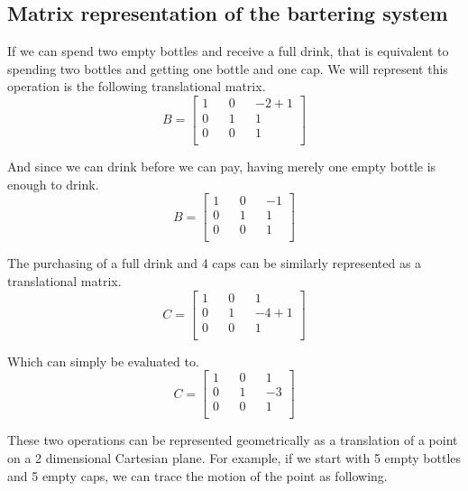 \documentclass[letterpaper, 12pt]{article}
\begin{document}
\subsection{Matrix representation of the bartering system}
\par If we can spend two empty bottles and receive a full drink, that is equivalent to spending two bottles and getting one bottle and one cap.
We will represent this operation is the following translational matrix.
\[
	B=
	\begin{bmatrix}
		1 && 0 && -2 + 1\\
		0 && 1 &&  1\\
		0 && 0 &&  1\\
	\end{bmatrix}
\]
\par And since we can drink before we can pay, having merely one empty bottle is enough to drink.
\[
	B=
	\begin{bmatrix}
		1 && 0 && -1\\
		0 && 1 &&  1\\
		0 && 0 &&  1\\
	\end{bmatrix}
\]
\par The purchasing of a full drink and 4 caps can be similarly represented as a translational matrix.
\[
	C=
	\begin{bmatrix}
		1 && 0 &&  1\\
		0 && 1 && -4 + 1\\
		0 && 0 &&  1\\
	\end{bmatrix}
\]
\par Which can simply be evaluated to.
\[
	C=
	\begin{bmatrix}
		1 && 0 &&  1\\
		0 && 1 && -3\\
		0 && 0 &&  1\\
	\end{bmatrix}
\]
\par These two operations can be represented geometrically as a translation of a point on a 2 dimensional Cartesian plane.
For example, if we start with 5 empty bottles and 5 empty caps, we can trace the motion of the point as following.
\begin{center}
\end{center}
\end{document}
